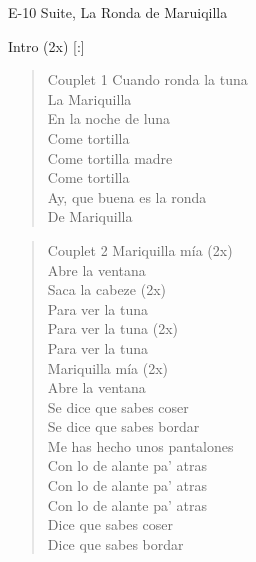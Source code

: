 \begin{song}[vals]{E-10 Suite, La Ronda de Maruiqilla}
\begin{instrumental}{Intro (2x)}
       [:] \measure{}   
\end{instrumental}

\begin{verse}{Couplet 1}
Cuando ronda la tuna\\
La Mariquilla\\
\chord{}En la noche de luna\\
Come tortilla\\
\chord{}Come tortilla madre\\
Come tortilla\\
\chord{}Ay, que buena es la ronda\\
De Mariquilla\\
\end{verse}

\begin{verse}{Couplet 2}
\chord{}Mariquilla mía (2x)\\
Abre la ventana\\
\chord{}Saca la cabeze (2x) \\
Para ver la tuna\\
\chord{}Para ver la tuna (2x)\\
Para ver la tuna\\
\chord{}Mariquilla mía (2x)\\
Abre la ventana\\
\chord{}Se dice que sabes coser \hspace{1em} \hspace{1em} \\
\chord{}Se dice que sabes bordar \hspace{1em} \hspace{1em} \\
\chord{}Me has hecho unos pantalones\\
Con lo de alante pa' atras\\
\chord{}Con lo de alante pa' atras\hspace{1em} \hspace{1em} \\
\chord{}Con lo de alante pa' atras\hspace{1em} \hspace{1em} \\
\chord{}Dice que sabes coser\\
Dice que sabes bordar\\
\end{verse}


\end{song}
